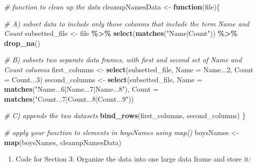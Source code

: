 \documentclass[
]{book}
\newenvironment{Shaded}{\begin{snugshade}}{\end{snugshade}}
\newcommand{\CommentTok}[1]{\textcolor[rgb]{0.56,0.35,0.01}{\textit{#1}}}
\newcommand{\ControlFlowTok}[1]{\textcolor[rgb]{0.13,0.29,0.53}{\textbf{#1}}}
\newcommand{\DataTypeTok}[1]{\textcolor[rgb]{0.13,0.29,0.53}{#1}}
\newcommand{\DecValTok}[1]{\textcolor[rgb]{0.00,0.00,0.81}{#1}}
\newcommand{\KeywordTok}[1]{\textcolor[rgb]{0.13,0.29,0.53}{\textbf{#1}}}
\newcommand{\NormalTok}[1]{#1}
\newcommand{\OperatorTok}[1]{\textcolor[rgb]{0.81,0.36,0.00}{\textbf{#1}}}
\newcommand{\StringTok}[1]{\textcolor[rgb]{0.31,0.60,0.02}{#1}}
\providecommand{\tightlist}{%
  \setlength{\itemsep}{0pt}\setlength{\parskip}{0pt}}
\begin{document}
\begin{Shaded}
\begin{Highlighting}[]
\CommentTok{\# function to clean up the data}
\NormalTok{cleanupNamesData \textless{}{-}}\StringTok{ }\ControlFlowTok{function}\NormalTok{(file)\{}
  
  \CommentTok{\# A) subset data to include only those columns that include the term \textasciigrave{}Name\textasciigrave{} and \textasciigrave{}Count\textasciigrave{}}
\NormalTok{  subsetted\_file \textless{}{-}}\StringTok{ }\NormalTok{file }\OperatorTok{\%\textgreater{}\%}
\StringTok{    }\KeywordTok{select}\NormalTok{(}\KeywordTok{matches}\NormalTok{(}\StringTok{"Name|Count"}\NormalTok{)) }\OperatorTok{\%\textgreater{}\%}
\StringTok{    }\KeywordTok{drop\_na}\NormalTok{()}

  \CommentTok{\# B) subsets two separate data frames, with first and second set of \textasciigrave{}Name\textasciigrave{} and \textasciigrave{}Count\textasciigrave{} columns }
\NormalTok{  first\_columns \textless{}{-}}\StringTok{ }\KeywordTok{select}\NormalTok{(subsetted\_file, }\DataTypeTok{Name =}\NormalTok{ Name...}\DecValTok{2}\NormalTok{, }\DataTypeTok{Count =}\NormalTok{ Count...}\DecValTok{3}\NormalTok{) }
\NormalTok{  second\_columns \textless{}{-}}\StringTok{ }\KeywordTok{select}\NormalTok{(subsetted\_file, }\DataTypeTok{Name =} \KeywordTok{matches}\NormalTok{(}\StringTok{"Name...6|Name...7|Name...8"}\NormalTok{),}
                                           \DataTypeTok{Count =} \KeywordTok{matches}\NormalTok{(}\StringTok{"Count...7|Count...8|Count...9"}\NormalTok{))}

  \CommentTok{\# C) appends the two datasets}
  \KeywordTok{bind\_rows}\NormalTok{(first\_columns, second\_columns)}
\NormalTok{\}}

\CommentTok{\# apply your function to elements in \textasciigrave{}boysNames\textasciigrave{} using \textasciigrave{}map()\textasciigrave{}}
\NormalTok{boysNames \textless{}{-}}\StringTok{ }\KeywordTok{map}\NormalTok{(boysNames, cleanupNamesData)}
\end{Highlighting}
\end{Shaded}

\begin{enumerate}
\def\labelenumi{\arabic{enumi}.}
\setcounter{enumi}{2}
\tightlist
\item
  Code for Section 3: Organize the data into one large data frame and store it:
\end{enumerate}
\end{document}
